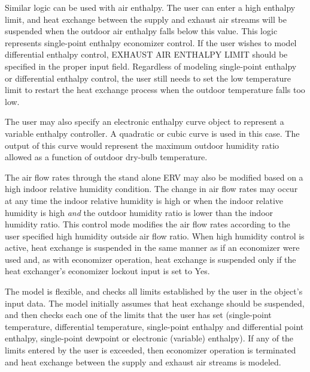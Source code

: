 Similar logic can be used with air enthalpy. The user can enter a high enthalpy limit, and heat exchange between the supply and exhaust air streams will be suspended when the outdoor air enthalpy falls below this value. This logic represents single-point enthalpy economizer control. If the user wishes to model differential enthalpy control, EXHAUST AIR ENTHALPY LIMIT should be specified in the proper input field. Regardless of modeling single-point enthalpy or differential enthalpy control, the user still needs to set the low temperature limit to restart the heat exchange process when the outdoor temperature falls too low.

The user may also specify an electronic enthalpy curve object to represent a variable enthalpy controller. A quadratic or cubic curve is used in this case. The output of this curve would represent the maximum outdoor humidity ratio allowed as a function of outdoor dry-bulb temperature.

The air flow rates through the stand alone ERV may also be modified based on a high indoor relative humidity condition. The change in air flow rates may occur at any time the indoor relative humidity is high or when the indoor relative humidity is high \emph{and} the outdoor humidity ratio is lower than the indoor humidity ratio. This control mode modifies the air flow rates according to the user specified high humidity outside air flow ratio. When high humidity control is active, heat exchange is suspended in the same manner as if an economizer were used and, as with economizer operation, heat exchange is suspended only if the heat exchanger's economizer lockout input is set to Yes.

The model is flexible, and checks all limits established by the user in the object's input data. The model initially assumes that heat exchange should be suspended, and then checks each one of the limits that the user has set (single-point temperature, differential temperature, single-point enthalpy and differential point enthalpy, single-point dewpoint or electronic (variable) enthalpy). If any of the limits entered by the user is exceeded, then economizer operation is terminated and heat exchange between the supply and exhaust air streams is modeled.
